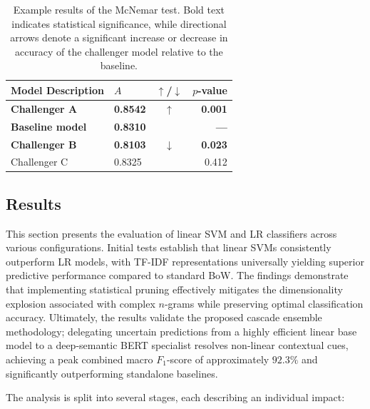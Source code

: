 \documentclass[a4paper,fleqn]{cas-dc}
\newcommand{\accuracy}{A}
\newcommand{\logreg}{LR}
\newcommand{\mcnemarp}{p}
\begin{document}
\begin{table}[htbp]
	\centering
	\caption{Example results of the McNemar test. Bold text indicates statistical significance, while directional arrows denote a significant increase or decrease in accuracy of the challenger model relative to the baseline.}
	\label{tab:McNemarExample}
	\begin{tabular}{llcr}
		\toprule
		Model Description & $\accuracy$ &  $\uparrow$/$\downarrow$ & $\mcnemarp$-value \\
		\midrule
		\textbf{Challenger A} & \textbf{0.8542} & \textbf{$\uparrow$} & \textbf{0.001} \\
		\textbf{Baseline model}                      & \textbf{0.8310} &                      & \textbf{---}  \\
		\textbf{Challenger B}  & \textbf{0.8103} & \textbf{$\downarrow$} & \textbf{0.023} \\
		Challenger C                 & 0.8325          &                      & 0.412 \\
		\bottomrule
	\end{tabular}
\end{table}

\subsection{Results}
\label{sec:results}

This section presents the evaluation of linear SVM and \logreg{} classifiers across various configurations. Initial tests establish that linear SVMs consistently outperform \logreg{} models, with TF-IDF representations universally yielding superior predictive performance compared to standard BoW. The findings demonstrate that implementing statistical pruning effectively mitigates the dimensionality explosion associated with complex $n$-grams while preserving optimal classification accuracy. Ultimately, the results validate the proposed cascade ensemble methodology; delegating uncertain predictions from a highly efficient linear base model to a deep-semantic BERT specialist resolves non-linear contextual cues, achieving a peak combined macro $F_1$-score of approximately $92.3\%$ and significantly outperforming standalone baselines.

The analysis is split into several stages, each describing an individual impact:
\end{document}
